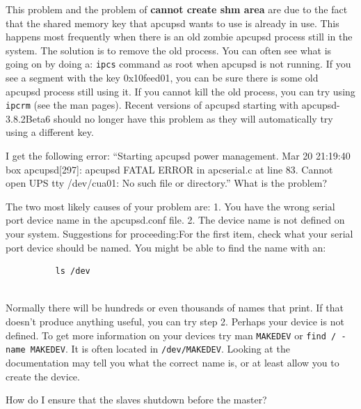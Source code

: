 {{{{{{\begin{description}
{{\item [A:]
   This problem and the problem of {\bf cannot create shm area} are due to the
fact that the shared memory key that apcupsd wants to use is already in use.
This happens most frequently when there is an old zombie apcupsd process still
in the system.  The solution is to remove the old process.  You can often see
what is going on by doing a: {\tt ipcs} command as root when apcupsd is not
running. If you see a segment with the key 0x10feed01, you can be sure there
is some old apcupsd process still using it. If you cannot kill the old
process, you can try using {\tt ipcrm} (see the man pages).  Recent versions
of apcupsd starting with apcupsd-3.8.2Beta6 should no longer have this problem
as they will automatically try using a different key.  

\item [Q:]
   I get the following error: ``Starting apcupsd power management.  Mar 20
21:19:40 box apcupsd[297]: apcupsd FATAL ERROR in apcserial.c at line 83.
Cannot open UPS tty /dev/cua01: No such file or directory.'' What is the
problem?  

\item [A:]
   The two most likely causes of your problem are:  1. You have the wrong serial
port device name in the apcupsd.conf file. 2. The device name is not defined
on your system. Suggestions for proceeding:For the first item, check what your
serial port device should be named. You might be able to find the name with
an:  

\footnotesize
\begin{verbatim}
          ls /dev
     
\end{verbatim}
\normalsize

Normally there will be hundreds or even thousands of names that print. If that
doesn't produce anything useful, you can try step 2.  Perhaps your device is
not defined. To get more information on your devices try man {\tt MAKEDEV} or
{\tt find / -name MAKEDEV}.  It is often located in {\tt /dev/MAKEDEV}. 
Looking at the documentation may tell you what the correct name is, or at
least allow you to create the device.  

\item [Q:]
   How do I ensure that the slaves shutdown before the master?  

}}
\end{description}}}}}}}

